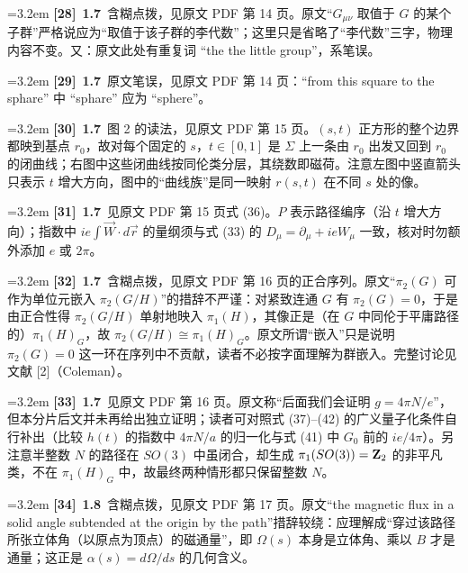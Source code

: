 \par
\par\medskip\noindent\hangindent=3.2em \textbf{[28]}~\textbf{1.7}~含糊点拨，见原文 PDF 第 14 页。原文“$G_{\mu\nu}$ 取值于 $G$ 的某个子群”严格说应为“取值于该子群的李代数”；这里只是省略了“李代数”三字，物理内容不变。又：原文此处有重复词 “the the little group”，系笔误。
\par
\par\medskip\noindent\hangindent=3.2em \textbf{[29]}~\textbf{1.7}~原文笔误，见原文 PDF 第 14 页：“from this square to the sphare” 中 “sphare” 应为 “sphere”。
\par
\par\medskip\noindent\hangindent=3.2em \textbf{[30]}~\textbf{1.7}~图 2 的读法，见原文 PDF 第 15 页。$(s,t)$ 正方形的整个边界都映到基点 $r_0$，故对每个固定的 $s$，$t\in[0,1]$ 是 $\Sigma$ 上一条由 $r_0$ 出发又回到 $r_0$ 的闭曲线；右图中这些闭曲线按同伦类分层，其绕数即磁荷。注意左图中竖直箭头只表示 $t$ 增大方向，图中的“曲线族”是同一映射 $r(s,t)$ 在不同 $s$ 处的像。
\par
\par\medskip\noindent\hangindent=3.2em \textbf{[31]}~\textbf{1.7}~见原文 PDF 第 15 页式 (36)。$P$ 表示路径编序（沿 $t$ 增大方向）；指数中 $ie\int\vec{W}\cdot d\vec{r}$ 的量纲须与式 (33) 的 $D_\mu=\partial_\mu+ieW_\mu$ 一致，核对时勿额外添加 $e$ 或 $2\pi$。
\par
\par\medskip\noindent\hangindent=3.2em \textbf{[32]}~\textbf{1.7}~含糊点拨，见原文 PDF 第 16 页的正合序列。原文“$\pi_2(G)$ 可作为单位元嵌入 $\pi_2(G/H)$”的措辞不严谨：对紧致连通 $G$ 有 $\pi_2(G)=0$，于是由正合性得 $\pi_2(G/H)$ 单射地映入 $\pi_1(H)$，其像正是（在 $G$ 中同伦于平庸路径的）$\pi_1(H)_G$，故 $\pi_2(G/H)\cong\pi_1(H)_G$。原文所谓“嵌入”只是说明 $\pi_2(G)=0$ 这一环在序列中不贡献，读者不必按字面理解为群嵌入。完整讨论见文献 [2]（Coleman）。
\par
\par\medskip\noindent\hangindent=3.2em \textbf{[33]}~\textbf{1.7}~见原文 PDF 第 16 页。原文称“后面我们会证明 $g=4\pi N/e$”，但本分片后文并未再给出独立证明；读者可对照式 (37)–(42) 的广义量子化条件自行补出（比较 $h(t)$ 的指数中 $4\pi N/a$ 的归一化与式 (41) 中 $G_0$ 前的 $ie/4\pi$）。另注意半整数 $N$ 的路径在 $SO(3)$ 中虽闭合，却生成 $\pi_1(SO(3))={\bf Z}_2$ 的非平凡类，不在 $\pi_1(H)_G$ 中，故最终两种情形都只保留整数 $N$。
\par
\par\medskip\noindent\hangindent=3.2em \textbf{[34]}~\textbf{1.8}~含糊点拨，见原文 PDF 第 17 页。原文“the magnetic flux in a solid angle subtended at the origin by the path”措辞较绕：应理解成“穿过该路径所张立体角（以原点为顶点）的磁通量”，即 $\Omega(s)$ 本身是立体角、乘以 $B$ 才是通量；这正是 $\alpha(s)=d\Omega/ds$ 的几何含义。
